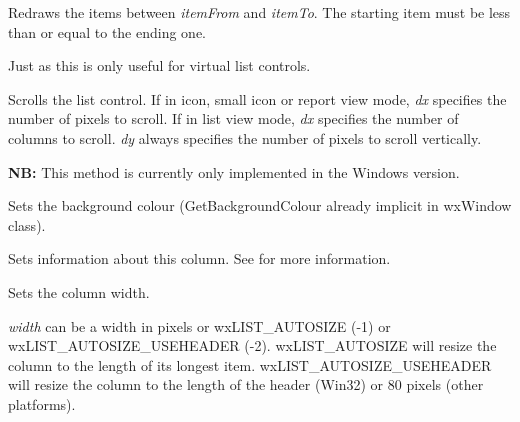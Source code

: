 



\label{wxlistctrlrefreshitems}


Redraws the items between {\it itemFrom} and {\it itemTo}. The starting item
must be less than or equal to the ending one.

Just as  this is only useful for
virtual list controls.



\label{wxlistctrlscrolllist}


Scrolls the list control. If in icon, small icon or report view mode,
{\it dx} specifies the number of pixels to scroll. If in list view mode,
{\it dx} specifies the number of columns to scroll. {\it dy} always specifies
the number of pixels to scroll vertically.

{\bf NB:} This method is currently only implemented in the Windows version.


\label{wxlistctrlsetbackgroundcolour}


Sets the background colour (GetBackgroundColour already implicit in
wxWindow class).


\label{wxlistctrlsetcolumn}


Sets information about this column. See  for more
information.


\label{wxlistctrlsetcolumnwidth}


Sets the column width.

{\it width} can be a width in pixels or wxLIST\_AUTOSIZE (-1) or wxLIST\_AUTOSIZE\_USEHEADER (-2).
wxLIST\_AUTOSIZE will resize the column to the length of its longest item. wxLIST\_AUTOSIZE\_USEHEADER
will resize the column to the length of the header (Win32) or 80 pixels (other platforms).

